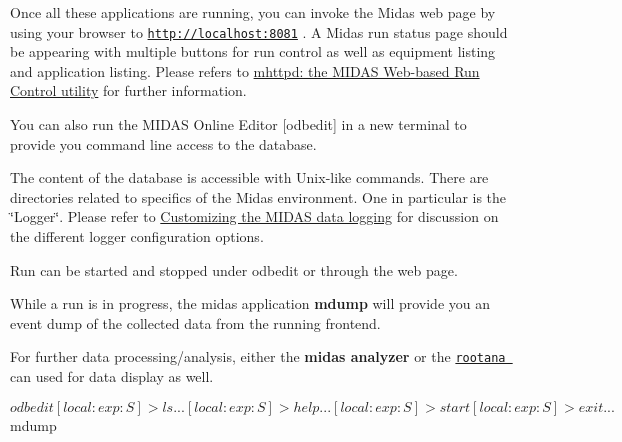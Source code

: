 


\begin{DoxyItemize}
\item Once all these applications are running, you can invoke the Midas web page by using your browser to \href{http://localhost:8081}{\tt http://localhost:8081} . A Midas run status page should be appearing with multiple buttons for run control as well as equipment listing and application listing. Please refers to \hyperlink{RC_mhttpd}{mhttpd: the MIDAS Web-\/based Run Control utility} for further information.
\item You can also run the MIDAS Online Editor \mbox{[}odbedit\mbox{]} in a new terminal to provide you command line access to the database.
\begin{DoxyItemize}
\item The content of the database is accessible with Unix-\/like commands. There are directories related to specifics of the Midas environment. One in particular is the \char`\"{}Logger\char`\"{}. Please refer to \hyperlink{F_Logging_Data}{Customizing the MIDAS data logging} for discussion on the different logger configuration options.
\end{DoxyItemize}
\item Run can be started and stopped under odbedit or through the web page.
\item While a run is in progress, the midas application {\bfseries mdump} will provide you an event dump of the collected data from the running frontend.
\item For further data processing/analysis, either the {\bfseries  midas analyzer } or the \href{http://daq-plone.triumf.ca/SR/rootana}{\tt rootana } can used for data display as well. 
\begin{DoxyCode}
    $odbedit
        [local:exp:S]> ls
        ...
        [local:exp:S]> help
        ...
        [local:exp:S]> start
        [local:exp:S]> exit
        ...
        $ mdump
\end{DoxyCode}
 \par

\end{DoxyItemize}




